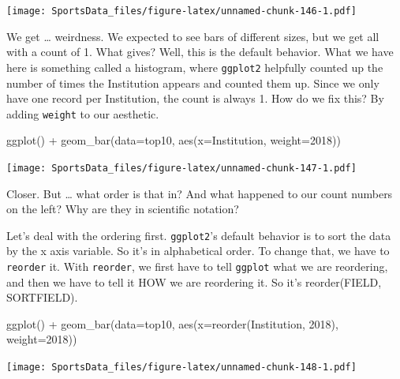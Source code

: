 \documentclass[
]{book}
\newenvironment{Shaded}{\begin{snugshade}}{\end{snugshade}}
\newcommand{\AttributeTok}[1]{\textcolor[rgb]{0.77,0.63,0.00}{#1}}
\newcommand{\FunctionTok}[1]{\textcolor[rgb]{0.00,0.00,0.00}{#1}}
\newcommand{\NormalTok}[1]{#1}
\newcommand{\SpecialCharTok}[1]{\textcolor[rgb]{0.00,0.00,0.00}{#1}}
\newcommand{\StringTok}[1]{\textcolor[rgb]{0.31,0.60,0.02}{#1}}
\begin{document}
\texttt{[image: SportsData\_files/figure-latex/unnamed-chunk-146-1.pdf]}

We get \ldots{} weirdness. We expected to see bars of different sizes, but we get all with a count of 1. What gives? Well, this is the default behavior. What we have here is something called a histogram, where \texttt{ggplot2} helpfully counted up the number of times the Institution appears and counted them up. Since we only have one record per Institution, the count is always 1. How do we fix this? By adding \texttt{weight} to our aesthetic.

\begin{Shaded}
\begin{Highlighting}[]
\FunctionTok{ggplot}\NormalTok{() }\SpecialCharTok{+} 
  \FunctionTok{geom\_bar}\NormalTok{(}\AttributeTok{data=}\NormalTok{top10, }\FunctionTok{aes}\NormalTok{(}\AttributeTok{x=}\NormalTok{Institution, }\AttributeTok{weight=}\StringTok{\textasciigrave{}}\AttributeTok{2018}\StringTok{\textasciigrave{}}\NormalTok{))}
\end{Highlighting}
\end{Shaded}

\texttt{[image: SportsData\_files/figure-latex/unnamed-chunk-147-1.pdf]}

Closer. But \ldots{} what order is that in? And what happened to our count numbers on the left? Why are they in scientific notation?

Let's deal with the ordering first. \texttt{ggplot2}'s default behavior is to sort the data by the x axis variable. So it's in alphabetical order. To change that, we have to \texttt{reorder} it. With \texttt{reorder}, we first have to tell \texttt{ggplot} what we are reordering, and then we have to tell it HOW we are reordering it. So it's reorder(FIELD, SORTFIELD).

\begin{Shaded}
\begin{Highlighting}[]
\FunctionTok{ggplot}\NormalTok{() }\SpecialCharTok{+} \FunctionTok{geom\_bar}\NormalTok{(}\AttributeTok{data=}\NormalTok{top10, }\FunctionTok{aes}\NormalTok{(}\AttributeTok{x=}\FunctionTok{reorder}\NormalTok{(Institution, }\StringTok{\textasciigrave{}}\AttributeTok{2018}\StringTok{\textasciigrave{}}\NormalTok{), }\AttributeTok{weight=}\StringTok{\textasciigrave{}}\AttributeTok{2018}\StringTok{\textasciigrave{}}\NormalTok{))}
\end{Highlighting}
\end{Shaded}

\texttt{[image: SportsData\_files/figure-latex/unnamed-chunk-148-1.pdf]}
\end{document}

